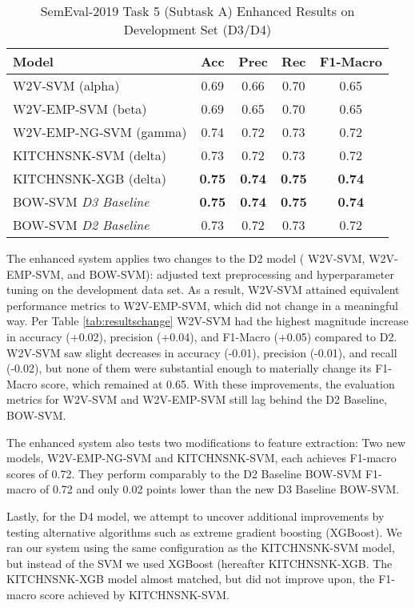 \documentclass[11pt,a4paper]{article}
\begin{document}
\begin{table}[hbt!]
\centering
\caption{SemEval-2019 Task 5 (Subtask A) Enhanced Results on Development Set (D3/D4)}
\label{tab:enhancedresults}
\scriptsize
\begin{tabular}{lcccc}
\hline
Model & Acc & Prec & Rec & F1-Macro \\ \hline
\textsc{W2V-SVM} (alpha) & 0.69 & 0.66 & 0.70 & 0.65  \\
\textsc{W2V-EMP-SVM} (beta) & 0.69 & 0.65 & 0.70 & 0.65 \\
\textsc{W2V-EMP-NG-SVM} (gamma) & 0.74 & 0.72 & 0.73 & 0.72 \\
\textsc{KITCHNSNK-SVM} (delta) & 0.73 & 0.72 & 0.73 & 0.72 \\
\textsc{KITCHNSNK-XGB} (delta) & \textbf{0.75} & \textbf{0.74} & \textbf{0.75} & \textbf{0.74} \\
\textsc{BOW-SVM} \textit{D3 Baseline} & \textbf{0.75} & \textbf{0.74} & \textbf{0.75} & \textbf{0.74} \\
\textsc{BOW-SVM} \textit{D2 Baseline} & 0.73 & 0.72 & 0.73 & 0.72 \\
\hline
\end{tabular}
\end{table}

The enhanced system applies two changes to the D2 model ( \textsc{W2V-SVM}, \textsc{W2V-EMP-SVM}, and \textsc{BOW-SVM}): adjusted text preprocessing and hyperparameter tuning on the development data set. As a result, \textsc{W2V-SVM} attained equivalent performance metrics to \textsc{W2V-EMP-SVM}, which did not change in a meaningful way. Per Table \ref{tab:resultschange} \textsc{W2V-SVM} had the highest magnitude increase in accuracy (+0.02), precision (+0.04), and F1-Macro (+0.05) compared to D2. \textsc{W2V-SVM} saw slight decreases in accuracy (-0.01), precision (-0.01), and recall (-0.02), but none of them were substantial enough to materially change its F1-Macro score, which remained at 0.65. With these improvements, the evaluation metrics for \textsc{W2V-SVM} and \textsc{W2V-EMP-SVM} still lag behind the D2 Baseline, \textsc{BOW-SVM}.

The enhanced system also tests two modifications to feature extraction:  Two new models, \textsc{W2V-EMP-NG-SVM} and \textsc{KITCHNSNK-SVM}, each achieves F1-macro scores of 0.72. They perform comparably to the D2 Baseline \textsc{BOW-SVM} F1-macro of 0.72 and only 0.02 points lower than the new D3 Baseline \textsc{BOW-SVM}.

Lastly, for the D4 model, we attempt to uncover additional improvements by testing alternative algorithms such as extreme gradient boosting (XGBoost). We ran our system using the same configuration as the \textsc{KITCHNSNK-SVM} model, but instead of the SVM we used XGBoost (hereafter \textsc{KITCHNSNK-XGB}. The \textsc{KITCHNSNK-XGB} model almost matched, but did not improve upon, the F1-macro score achieved by \textsc{KITCHNSNK-SVM}.
\end{document}

